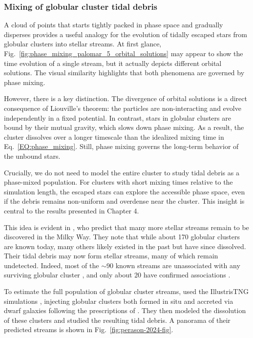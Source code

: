         \subsubsection{Mixing of globular cluster tidal debris}
            A cloud of points that starts tightly packed in phase space and gradually disperses provides a useful analogy for the evolution of tidally escaped stars from globular clusters into stellar streams. At first glance, Fig.~\ref{fig:phase_mixing_palomar_5_orbital_solutions} may appear to show the time evolution of a single stream, but it actually depicts different orbital solutions. The visual similarity highlights that both phenomena are governed by phase mixing.

            However, there is a key distinction. The divergence of orbital solutions is a direct consequence of Liouville’s theorem: the particles are non-interacting and evolve independently in a fixed potential. In contrast, stars in globular clusters are bound by their mutual gravity, which slows down phase mixing. As a result, the cluster dissolves over a longer timescale than the idealized mixing time in Eq.~\ref{EQ:phase_mixing}. Still, phase mixing governs the long-term behavior of the unbound stars.

            Crucially, we do not need to model the entire cluster to study tidal debris as a phase-mixed population. For clusters with short mixing times relative to the simulation length, the escaped stars can explore the accessible phase space, even if the debris remains non-uniform and overdense near the cluster. This insight is central to the results presented in Chapter 4.

            This idea is evident in \citet{2024ApJ...976...54P}, who predict that many more stellar streams remain to be discovered in the Milky Way. They note that while about 170 globular clusters are known today, many others likely existed in the past but have since dissolved. Their tidal debris may now form stellar streams, many of which remain undetected. Indeed, most of the $\sim$90 known streams are unassociated with any surviving globular cluster \citep{2022ApJ...926..107M}, and only about 20 have confirmed associations \citep{2024ApJ...967...89I}.

            To estimate the full population of globular cluster streams, \citet{2024ApJ...976...54P} used the IllustrisTNG simulations \citep{2019ComAC...6....2N}, injecting globular clusters both formed in situ and accreted via dwarf galaxies following the prescriptions of \citet{2022MNRAS.514.4736C,2023MNRAS.522.5638C}. They then modeled the dissolution of these clusters and studied the resulting tidal debris. A panorama of their predicted streams is shown in Fig.~\ref{fig:perason-2024-fig}.

